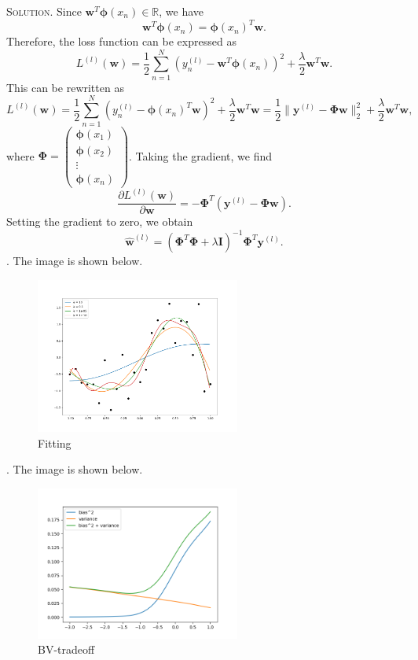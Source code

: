 \documentclass[12pt, a4paper, oneside]{ctexart}
\newenvironment{solution}{\par\noindent\textsc{Solution. }}{\\\par}
\begin{document}
\begin{solution}
	Since \(\mathbf{w}^T \bm{\phi}(x_n) \in \mathbb{R}\), we have 
	\[
	\mathbf{w}^T \bm{\phi}(x_n) = \bm{\phi}(x_n)^T \mathbf{w}.
	\]
	Therefore, the loss function can be expressed as 
	\[
	L^{(l)}(\mathbf{w}) = \frac{1}{2} \sum_{n=1}^N \left( y^{(l)}_n - \mathbf{w}^T \bm{\phi}(x_n) \right)^2 + \frac{\lambda}{2} \mathbf{w}^T \mathbf{w}.
	\]
	This can be rewritten as 
	\[
	L^{(l)}(\mathbf{w}) = \frac{1}{2} \sum_{n=1}^N \left( y^{(l)}_n - \bm{\phi}(x_n)^T \mathbf{w} \right)^2 + \frac{\lambda}{2} \mathbf{w}^T \mathbf{w} = \frac{1}{2} \|\mathbf{y}^{(l)} - \bm\Phi \mathbf{w}\|^2_2 + \frac{\lambda}{2} \mathbf{w}^T \mathbf{w},
	\]
	where \(\bm\Phi = \begin{pmatrix} \bm\phi(x_1) \\ \bm\phi(x_2) \\ \vdots \\ \bm\phi(x_n) \end{pmatrix}\).
	Taking the gradient, we find 
	\[
	\frac{\partial L^{(l)}(\mathbf{w})}{\partial \mathbf{w}} = -\bm\Phi^T (\mathbf{y}^{(l)} - \bm\Phi \mathbf{w}).
	\]
	Setting the gradient to zero, we obtain 
	\[
	\hat{\mathbf{w}}^{(l)} = \left( \bm\Phi^T \bm\Phi + \lambda \mathbf{I} \right)^{-1} \bm\Phi^T \mathbf{y}^{(l)}.
	\]
	\newline{}.  The image is shown below.
		\begin{figure}[htbp]
				\centering
			    	\includegraphics[width=0.6\textwidth]{Figures/Figure_bv_1.png}
			    	\caption{Fitting}
			    	\label{fig:bv_1}
		\end{figure} 
	.  The image is shown below.
		\begin{figure}[htbp]
				\centering
			    	\includegraphics[width=0.6\textwidth]{Figures/Figure_bv_2.png}
			    	\caption{BV-tradeoff}
			    	\label{fig:bv_2}
		\end{figure} 
\end{solution}
\end{document}
